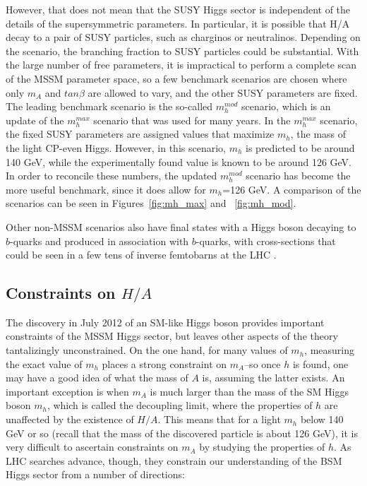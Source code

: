 However, that does not mean that the SUSY Higgs sector is 
independent of the details of the supersymmetric parameters.  In particular, 
it is possible that H/A decay to a pair of 
SUSY particles, such as charginos or neutralinos.  Depending on the 
scenario, the branching fraction to SUSY particles could be substantial.  
With the large number of free parameters, it is impractical to 
perform a complete scan of the MSSM parameter space, so a 
few benchmark scenarios are chosen where only $m_A$ 
and $tan\beta$ are allowed to vary, and 
the other SUSY parameters are fixed.  The leading benchmark scenario is 
the so-called $m_h^{mod}$ scenario, 
which is an update of the $m_h^{max}$ 
scenario that was used for many years.  In the $m_h^{max}$ 
scenario, the fixed SUSY parameters are assigned values that maximize $m_h$, 
the mass of the light CP-even Higgs.  However, 
in this scenario, $m_h$ is predicted to 
be around 140 GeV, while the experimentally found value is known 
to be around 126 GeV.  In order to reconcile these numbers, 
the updated $m_h^{mod}$ scenario has become 
the more useful benchmark, since it does allow for $m_h$=126 GeV.  
A comparison of the scenarios can be seen in Figures~\ref{fig:mh_max} and ~\ref{fig:mh_mod}.

Other non-MSSM scenarios also have final states with a Higgs boson
decaying to $b$-quarks and produced in association with $b$-quarks,
with cross-sections that could be seen in a few tens of inverse 
femtobarns at the LHC \cite{Gori}.   









\subsection{Constraints on $H/A$}
The discovery in July 2012 of an SM-like Higgs boson provides important constraints of the MSSM Higgs sector,
 but leaves other aspects of the theory tantalizingly unconstrained.  On the one hand, 
for many values of $m_h$, measuring the exact value of $m_h$ 
places a strong constraint on $m_A$--so once $h$ is found, one may have a good idea of what the mass of 
$A$ is, assuming the latter exists.  An important exception is when 
$m_A$ is much larger than the mass of the SM Higgs 
boson $m_h$, which is called the decoupling limit, where the 
properties of $h$ are unaffected by the existence of $H/A$.
  This means that for a light $m_h$ below 140 GeV 
or so (recall that the mass of the discovered particle is about 126 GeV),
 it is very difficult to ascertain constraints on $m_A$ by studying the properties of $h$.  
 As LHC searches advance, though, they constrain our understanding of the BSM 
 Higgs sector from a number of directions: 

